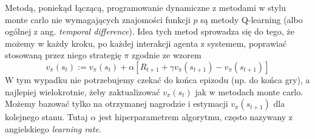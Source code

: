 \documentclass[licencjacka]{pracamgr}
\begin{document}
 Metodą, poniekąd łączącą, programowanie dynamiczne z metodami w stylu monte carlo nie wymagających znajomości funkcji $p$ są metody Q-learning (albo ogólnej z ang. \textit{temporal difference}).  Idea tych metod sprowadza się do tego, że możemy w każdy kroku, po każdej interakcji agenta z systemem, poprawiać stosowaną przez niego strategię $\pi$ zgodnie ze wzorem
\begin{equation}
   v_{\pi}(s_{t}) := v_{\pi}(s_{t}) +\alpha [R_{t+1} + \gamma v_{\pi}(s_{t+1}) - v_{\pi}(s_{t+1})]
 \end{equation}
 W tym wypadku nie potrzebujemy czekać do końca epizodu (np. do końca gry), a najlepiej wielokrotnie, żeby zaktualizować $v_{\pi}(s_{t})$ jak w metodach monte carlo. Możemy bazować tylko na otrzymanej nagrodzie i estymacji $v_{\pi}(s_{t+1})$ dla kolejnego stanu. Tutaj $\alpha$ jest hiperparametrem algorytmu, często nazywany z angielskiego \textit{learning rate}. 
 
\end{document}
